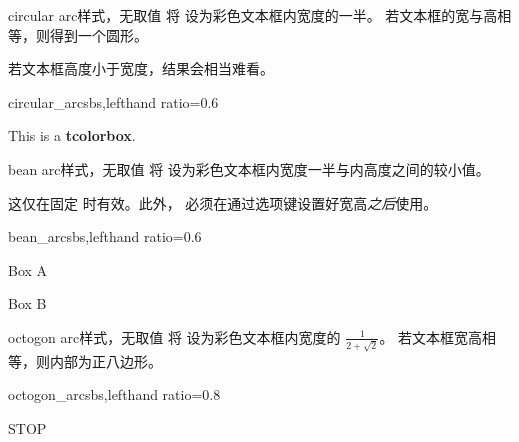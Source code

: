 \clearpage
\begin{docTcbKey}[][doc new=2015-05-05]{circular arc}{}{样式，无取值}
  将  设为彩色文本框内宽度的一半。
  若文本框的宽与高相等，则得到一个圆形。
  \begin{marker}
  若文本框高度小于宽度，结果会相当难看。
  \end{marker}
\begin{exdispExample*}{circular_arc}{sbs,lefthand ratio=0.6}
\begin{tcolorbox}[width=3cm,
  colback=red!5!white,
  colframe=red!75!black,
  halign=center,valign=center,
  square,circular arc]
This is a \textbf{tcolorbox}.
\end{tcolorbox}
\end{exdispExample*}
\end{docTcbKey}


\begin{docTcbKey}[][doc new=2015-05-05]{bean arc}{}{样式，无取值}
  将  设为彩色文本框内宽度一半与内高度之间的较小值。
  \begin{marker}
  这仅在固定  时有效。此外，
  必须在通过选项键设置好宽高\emph{之后}使用。
  \end{marker}
\begin{exdispExample*}{bean_arc}{sbs,lefthand ratio=0.6}

\begin{tcolorbox}[width=3cm,height=2cm,
  bean arc]
Box A
\end{tcolorbox}

\begin{tcolorbox}[width=2cm,height=3cm,
  bean arc]
Box B
\end{tcolorbox}
\end{exdispExample*}
\end{docTcbKey}

\begin{docTcbKey}[][doc new=2015-05-05]{octogon arc}{}{样式，无取值}
  将  设为彩色文本框内宽度的 $\frac{1}{2+\sqrt{2}}$。
  若文本框宽高相等，则内部为正八边形。
\begin{exdispExample*}{octogon_arc}{sbs,lefthand ratio=0.8}
\begin{tcolorbox}[enhanced,
  size=minimal,auto outer arc,
  width=2.1cm,octogon arc,
  colback=red,colframe=white,colupper=white,
  fontupper=\fontsize{7mm}{7mm}\selectfont\bfseries\sffamily,
  halign=center,valign=center,
  square,arc is angular,
  borderline={0.2mm}{-1mm}{red}  ]
STOP
\end{tcolorbox}
\end{exdispExample*}
\end{docTcbKey}


